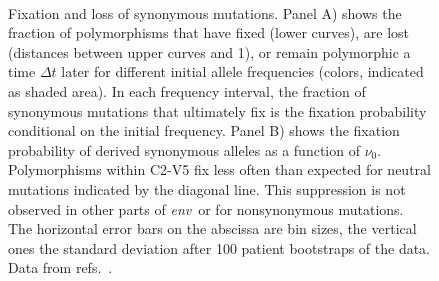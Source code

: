 \documentclass[rmp, twocolumn]{revtex4}
\newcommand{\env}{\textit{env}}
\newcommand{\shankaregion}{C2-V5}
\begin{document}
\begin{figure}
\begin{center}
\\
\caption{Fixation and loss of synonymous mutations.
Panel A) shows the fraction of polymorphisms that have fixed (lower curves),
are lost (distances between upper curves and 1), or remain polymorphic a time
$\Delta t$ later for different initial allele frequencies (colors, indicated as
shaded area).
In each frequency interval, the fraction of synonymous
mutations that ultimately fix is the fixation probability conditional on the
initial frequency.
Panel B) shows the fixation probability of derived synonymous
alleles as a function of $\nu_0$. Polymorphisms within \shankaregion{} fix less
often than expected for neutral mutations indicated by the diagonal line.
This suppression is not observed in other parts of \env~or for nonsynonymous mutations.
The horizontal error bars on the abscissa are bin sizes, the vertical ones the
standard deviation after 100 patient bootstraps of the data. Data from
refs.~\cite{shankarappa_consistent_1999,liu_selection_2006, bunnik_autologous_2008}.}
\label{fig:fixp}
\end{center}
\end{figure}
\end{document}
